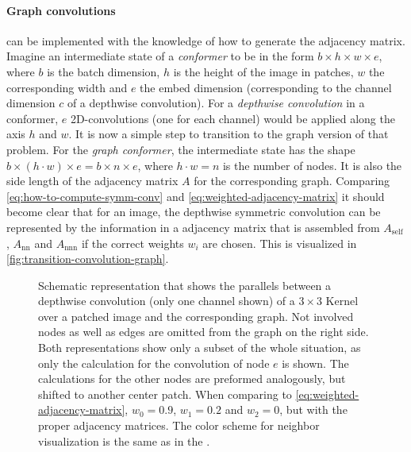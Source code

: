 \paragraph{Graph convolutions} can be implemented with the knowledge of how to generate the adjacency matrix.
Imagine an intermediate state of a \emph{conformer} to be in the form $b\times h\times w \times e$, where $b$ is the batch dimension, $h$ is the height of the image in patches, $w$ the corresponding width and $e$ the embed dimension (corresponding to the channel dimension $c$ of a depthwise convolution).
For a \emph{depthwise convolution} in a conformer, $e$ 2D-convolutions (one for each channel) would be applied along the axis $h$ and $w$. 
It is now a simple step to transition to the graph version of that problem.
For the \emph{graph conformer}, the intermediate state has the shape $b\times (h\cdot w) \times e = b\times n \times e$, where $h\cdot w = n$ is the number of nodes. 
It is also the side length of the adjacency matrix $A$ for the corresponding graph. 
Comparing \autoref{eq:how-to-compute-symm-conv} and \autoref{eq:weighted-adjacency-matrix} it should become clear that for an image, the depthwise symmetric convolution can be represented by the information in a adjacency matrix that is assembled from $A_\mathrm{self}$, $A_\mathrm{nn}$ and $A_\mathrm{nnn}$ if the correct weights $w_i$ are chosen. This is visualized in \autoref{fig:transition-convolution-graph}.

\begin{figure}[htbp]
    \centering
    \caption{Schematic representation that shows the parallels between a depthwise convolution (only one channel shown) of a $3\times 3$ Kernel over a patched image and the corresponding graph. Not involved nodes as well as edges are omitted from the graph on the right side. Both representations show only a subset of the whole situation, as only the calculation for the convolution of node $e$ is shown. The calculations for the other nodes are preformed analogously, but shifted to another center patch. When comparing to \autoref{eq:weighted-adjacency-matrix}, $w_0=0.9$, $w_1=0.2$ and $w_2=0$, but with the proper adjacency matrices.
    The color scheme for neighbor visualization is the same as in the .}
    \label{fig:transition-convolution-graph}
\end{figure}

